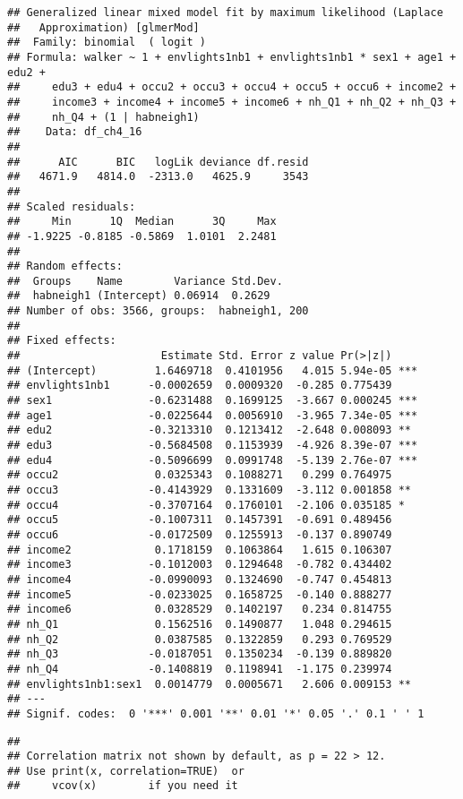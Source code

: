 \documentclass[
]{book}
\begin{document}
\begin{verbatim}
## Generalized linear mixed model fit by maximum likelihood (Laplace
##   Approximation) [glmerMod]
##  Family: binomial  ( logit )
## Formula: walker ~ 1 + envlights1nb1 + envlights1nb1 * sex1 + age1 + edu2 +  
##     edu3 + edu4 + occu2 + occu3 + occu4 + occu5 + occu6 + income2 +  
##     income3 + income4 + income5 + income6 + nh_Q1 + nh_Q2 + nh_Q3 +  
##     nh_Q4 + (1 | habneigh1)
##    Data: df_ch4_16
## 
##      AIC      BIC   logLik deviance df.resid 
##   4671.9   4814.0  -2313.0   4625.9     3543 
## 
## Scaled residuals: 
##     Min      1Q  Median      3Q     Max 
## -1.9225 -0.8185 -0.5869  1.0101  2.2481 
## 
## Random effects:
##  Groups    Name        Variance Std.Dev.
##  habneigh1 (Intercept) 0.06914  0.2629  
## Number of obs: 3566, groups:  habneigh1, 200
## 
## Fixed effects:
##                      Estimate Std. Error z value Pr(>|z|)    
## (Intercept)         1.6469718  0.4101956   4.015 5.94e-05 ***
## envlights1nb1      -0.0002659  0.0009320  -0.285 0.775439    
## sex1               -0.6231488  0.1699125  -3.667 0.000245 ***
## age1               -0.0225644  0.0056910  -3.965 7.34e-05 ***
## edu2               -0.3213310  0.1213412  -2.648 0.008093 ** 
## edu3               -0.5684508  0.1153939  -4.926 8.39e-07 ***
## edu4               -0.5096699  0.0991748  -5.139 2.76e-07 ***
## occu2               0.0325343  0.1088271   0.299 0.764975    
## occu3              -0.4143929  0.1331609  -3.112 0.001858 ** 
## occu4              -0.3707164  0.1760101  -2.106 0.035185 *  
## occu5              -0.1007311  0.1457391  -0.691 0.489456    
## occu6              -0.0172509  0.1255913  -0.137 0.890749    
## income2             0.1718159  0.1063864   1.615 0.106307    
## income3            -0.1012003  0.1294648  -0.782 0.434402    
## income4            -0.0990093  0.1324690  -0.747 0.454813    
## income5            -0.0233025  0.1658725  -0.140 0.888277    
## income6             0.0328529  0.1402197   0.234 0.814755    
## nh_Q1               0.1562516  0.1490877   1.048 0.294615    
## nh_Q2               0.0387585  0.1322859   0.293 0.769529    
## nh_Q3              -0.0187051  0.1350234  -0.139 0.889820    
## nh_Q4              -0.1408819  0.1198941  -1.175 0.239974    
## envlights1nb1:sex1  0.0014779  0.0005671   2.606 0.009153 ** 
## ---
## Signif. codes:  0 '***' 0.001 '**' 0.01 '*' 0.05 '.' 0.1 ' ' 1
\end{verbatim}

\begin{verbatim}
## 
## Correlation matrix not shown by default, as p = 22 > 12.
## Use print(x, correlation=TRUE)  or
##     vcov(x)        if you need it
\end{verbatim}
\end{document}
